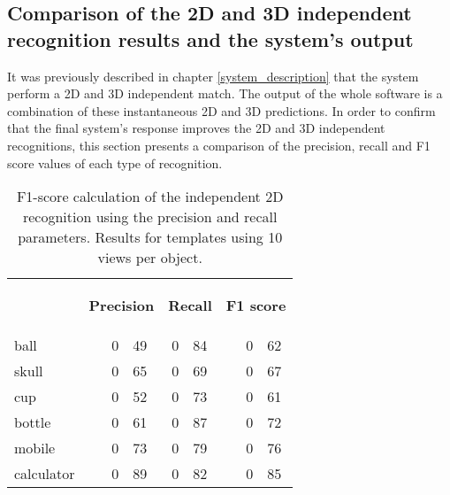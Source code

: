 	\subsection{Comparison of the 2D and 3D independent recognition results and the system's output}
	\label{results_2d_3d}
	It was previously described in chapter \ref{system_description} that the system perform a 2D and 3D independent match. 
	The output of the whole software is a combination of these instantaneous 2D and 3D predictions. 
	In order to confirm that the final system's response improves the 2D and 3D independent recognitions, this section presents a comparison of the precision, recall and F1 score values of each type of recognition. 
	
\begin{table}[H]
\centering
\begin{tabular} {l l r@{.}l r@{.}l l r@{.}l }
\toprule
\addlinespace[3mm]
   \multicolumn{1}{c}{\begin{center}\textbf{Object}\end{center}} &
   \multicolumn{3}{c}{\begin{center}\textbf{Precision}\end{center}} &
   \multicolumn{2}{c}{\begin{center}\textbf{Recall}\end{center}} &
   \multicolumn{3}{c}{\begin{center}\hspace*{0.2cm}\textbf{F1 score}\end{center}} &\\
\addlinespace[-3mm]

\midrule
ball		&&	0&49 	&	0&84	&&	0&62	\\
skull		&&	0&65	&	0&69	&&	0&67	\\
cup			&&	0&52	&	0&73	&&	0&61	\\
bottle		&&	0&61	&	0&87	&&	0&72	\\
mobile		&&	0&73	&	0&79	&&	0&76	\\
calculator	&&	0&89	&	0&82	&&	0&85	\\

\bottomrule
\end{tabular}
\caption[F1-score - 2D recognition]{F1-score calculation of the independent 2D recognition using the precision and recall parameters. Results for templates using 10 views per object. }
\label{2d_fscore}
\end{table}

\newpage


